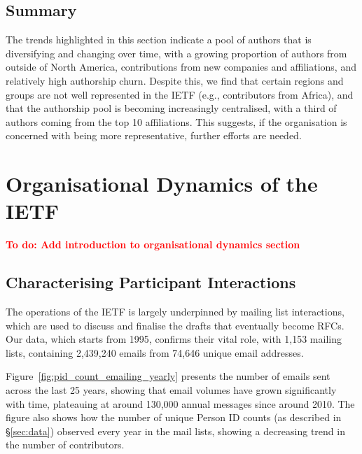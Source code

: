 \documentclass[twocolumn,10pt]{article}
\newcommand{\todo}[1]{\textbf{\textcolor{red}{To do: #1}}}
\newcommand{\pb}[1]{\vspace{0.75ex}\noindent{\textbf{#1}}}
\begin{document}
\subsection{Summary}
The trends highlighted in this section  indicate a pool of authors that is
diversifying and changing over time, with a growing proportion of authors
from outside of North America, contributions from new companies and
affiliations, and relatively high authorship churn. Despite this, we find
that certain regions and groups are not well represented in the IETF (e.g.,
contributors from Africa), and that the authorship pool is becoming
increasingly centralised, with a third of authors coming from the top 10
affiliations. This suggests, if the organisation is concerned with being
more representative, further efforts are needed.


\section{Organisational Dynamics of the IETF}
\label{sec:org-dynamics}

\todo{Add introduction to organisational dynamics section}

\subsection{Characterising Participant Interactions}
\label{sec:org-dynamics:participants}


The operations of the IETF is largely underpinned by mailing list
interactions, which are used to discuss and finalise the drafts that
eventually become RFCs. Our data, which starts from 1995, confirms their
vital role, with 1,153 mailing lists, containing 2,439,240 emails from
74,646 unique email addresses.

\pb{Volume of Discussion:}
Figure~\ref{fig:pid_count_emailing_yearly} presents the number of emails
sent across the last 25 years, showing that email volumes have grown
significantly with time, plateauing at around 130,000 annual messages since
around 2010. The figure also shows how the number of unique Person ID
counts (as described in \S\ref{sec:data}) observed every year in the mail
lists, showing a decreasing trend in the number of contributors.
\end{document}
